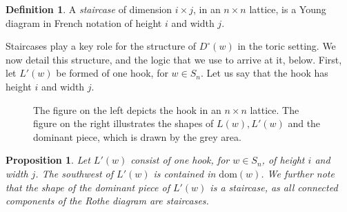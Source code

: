 \documentclass[11pt]{amsart}
\newtheorem{proposition}[theorem]{Proposition}
\theoremstyle{definition}
\theoremstyle{definition}
\newtheorem{definition}[theorem]{Definition}
\theoremstyle{definition}
\theoremstyle{definition}
\newcommand{\dom}{\mathrm{dom}}
\newcommand{\Dc}{D^{\circ}}
\begin{document}
\begin{definition}
    A \emph{staircase} of dimension $i \times j$, in an $n\times n$ lattice, is a Young diagram in French notation of height $i$ and width $j$. 
\end{definition}
\noindent Staircases play a key role for the structure of $\Dc(w)$ in the toric setting. We now detail this structure, and the logic that we use to arrive at it, below. 
First, let $L'(w)$ be formed of one hook, for $w \in S_n$. Let us say that the hook has height $i$ and width $j$. 
\begin{figure}[H]
\begin{minipage}{0.49\textwidth}
\centering
\end{minipage}
\begin{minipage}{0.49\textwidth}
\centering
{}
\end{minipage}
\caption{The figure on the left depicts the hook in an $n\times n$ lattice. The figure on the right illustrates the shapes of $L(w), L'(w)$ and the dominant piece, which is drawn by the grey area.}
\end{figure}

\begin{proposition}\label{prop: one hook}
    Let $L'(w)$ consist of one hook, for $w \in S_n$, of height $i$ and width $j$. The southwest of $L'(w)$ is contained in $\dom(w)$. We further note that the shape of the dominant piece of $L'(w)$ is a staircase, as all connected components of the Rothe diagram are staircases. 
\end{proposition}
\end{document}
